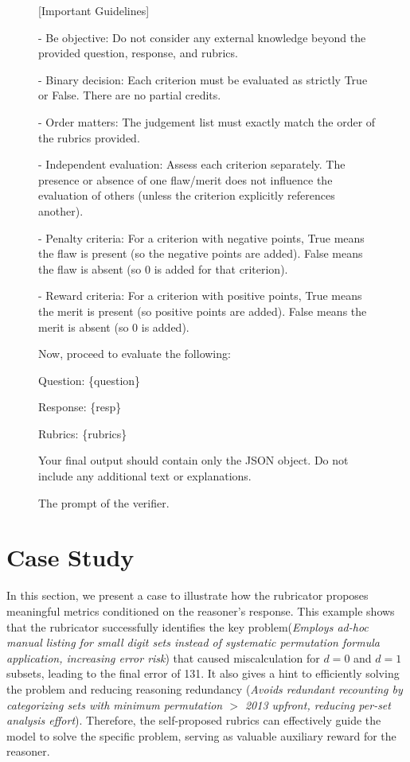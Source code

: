 \begin{figure}[ht]
\begin{lrbox}{\DSRPrompt}
\begin{gptpromptbox}
\begin{minipage}{0.95\linewidth}
[Important Guidelines]

- Be objective: Do not consider any external knowledge beyond the provided question, response, and rubrics.

- Binary decision: Each criterion must be evaluated as strictly True or False. There are no partial credits.

- Order matters: The judgement list must exactly match the order of the rubrics provided.

- Independent evaluation: Assess each criterion separately. The presence or absence of one flaw/merit does not influence the evaluation of others (unless the criterion explicitly references another).

\quad- Penalty criteria: For a criterion with negative points, True means the flaw is present (so the negative points are added). False means the flaw is absent (so 0 is added for that criterion).

\quad- Reward criteria: For a criterion with positive points, True means the merit is present (so positive points are added). False means the merit is absent (so 0 is added).

Now, proceed to evaluate the following:

Question:
\{question\}

Response:
\{resp\}

Rubrics:
\{rubrics\}

Your final output should contain only the JSON object. Do not include any additional text or explanations.

\end{minipage}
    \end{gptpromptbox}
    \end{lrbox}
    \usebox{\DSRPrompt}
    \caption{The prompt of the verifier.}
    \label{fig:evaluation-prompts}
\end{figure}

\clearpage
\section{Case Study} \label{apdx:case-study}
In this section, we present a case to illustrate how the rubricator proposes meaningful metrics conditioned on the reasoner's response. 
This example shows that the rubricator successfully identifies the key problem(\textit{Employs ad-hoc manual listing for small digit sets instead of systematic permutation formula application, increasing error risk}) that caused miscalculation for $d=0$ and $d=1$ subsets, leading to the final error of 131. It also gives a hint to efficiently solving the problem and reducing reasoning redundancy (\textit{Avoids redundant recounting by categorizing sets with minimum permutation $>$ 2013 upfront, reducing per-set analysis effort}). Therefore, the self-proposed rubrics can effectively guide the model to solve the specific problem, serving as valuable auxiliary reward for the reasoner.

